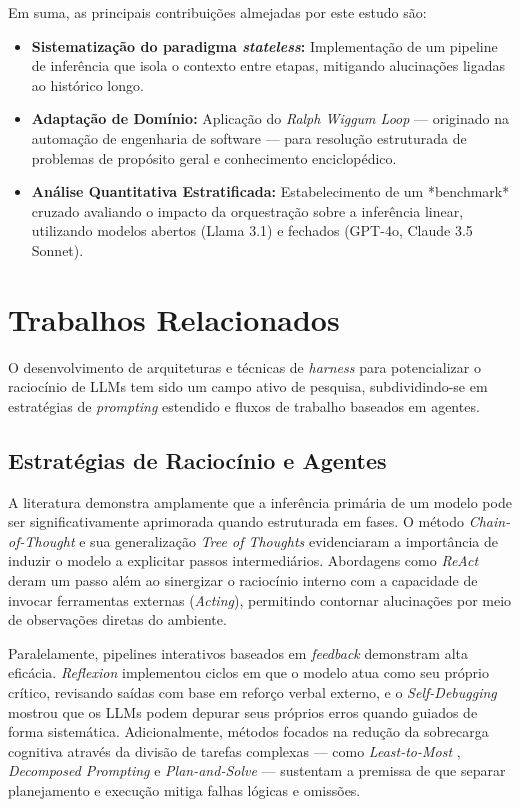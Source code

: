 \documentclass[a4paper,10pt,twocolumn]{article}
\begin{document}
Em suma, as principais contribuições almejadas por este estudo são:
\begin{itemize}
    \item \textbf{Sistematização do paradigma \textit{stateless}:} Implementação de um pipeline de inferência que isola o contexto entre etapas, mitigando alucinações ligadas ao histórico longo.
    \item \textbf{Adaptação de Domínio:} Aplicação do \textit{Ralph Wiggum Loop} --- originado na automação de engenharia de software --- para resolução estruturada de problemas de propósito geral e conhecimento enciclopédico.
    \item \textbf{Análise Quantitativa Estratificada:} Estabelecimento de um *benchmark* cruzado avaliando o impacto da orquestração sobre a inferência linear, utilizando modelos abertos (Llama 3.1) e fechados (GPT-4o, Claude 3.5 Sonnet).
\end{itemize}

\section{Trabalhos Relacionados}

O desenvolvimento de arquiteturas e técnicas de \textit{harness} para potencializar o raciocínio de LLMs tem sido um campo ativo de pesquisa, subdividindo-se em estratégias de \textit{prompting} estendido e fluxos de trabalho baseados em agentes.

\subsection{Estratégias de Raciocínio e Agentes}

A literatura demonstra amplamente que a inferência primária de um modelo pode ser significativamente aprimorada quando estruturada em fases. O método \textit{Chain-of-Thought} \cite{wei2022chain} e sua generalização \textit{Tree of Thoughts} \cite{yao2023tree} evidenciaram a importância de induzir o modelo a explicitar passos intermediários. Abordagens como \textit{ReAct} \cite{yao2022react} deram um passo além ao sinergizar o raciocínio interno com a capacidade de invocar ferramentas externas (\textit{Acting}), permitindo contornar alucinações por meio de observações diretas do ambiente.

Paralelamente, pipelines interativos baseados em \textit{feedback} demonstram alta eficácia. \textit{Reflexion} \cite{shinn2023reflexion} implementou ciclos em que o modelo atua como seu próprio crítico, revisando saídas com base em reforço verbal externo, e o \textit{Self-Debugging} \cite{chen2023selfdebug} mostrou que os LLMs podem depurar seus próprios erros quando guiados de forma sistemática. Adicionalmente, métodos focados na redução da sobrecarga cognitiva através da divisão de tarefas complexas --- como \textit{Least-to-Most} \cite{zhou2022least}, \textit{Decomposed Prompting} \cite{khot2022decomposed} e \textit{Plan-and-Solve} \cite{wang2023plan} --- sustentam a premissa de que separar planejamento e execução mitiga falhas lógicas e omissões.
\end{document}
